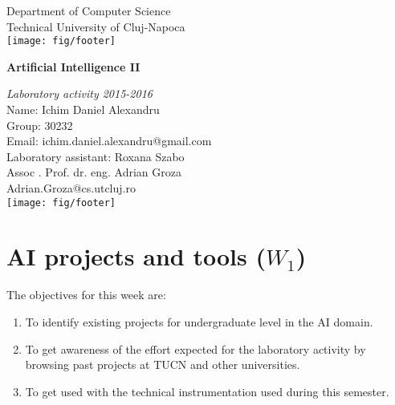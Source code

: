 \documentclass[a4paper,12pt]{report}
\begin{document}
\vspace{-5cm}
\begin{center}
Department of Computer Science\\
Technical University of Cluj-Napoca\\
\texttt{[image: fig/footer]}
\end{center}
\vspace{1cm}
\begin{center}
\begin{Large}
 \textbf{Artificial Intelligence II}\\
\end{Large}
\textit{Laboratory activity 2015-2016}\\
Name: Ichim Daniel Alexandru\\
Group: 30232\\
Email: ichim.daniel.alexandru@gmail.com\\
Laboratory assistant: Roxana Szabo\\
\vspace{15cm}
Assoc
. Prof. dr. eng. Adrian Groza\\
Adrian.Groza@cs.utcluj.ro\\
\vspace{1cm}
\texttt{[image: fig/footer]}
\end{center}

\tableofcontents




\chapter{AI projects and tools ($W_1$)}
The objectives for this week are:
\begin{enumerate}
 \item To identify existing projects for undergraduate level in the AI domain.
\item To get awareness of the effort expected for the laboratory activity by browsing past projects at TUCN and other universities.
\item To get used with the technical instrumentation used during this semester. 
\end{enumerate}
\end{document}
